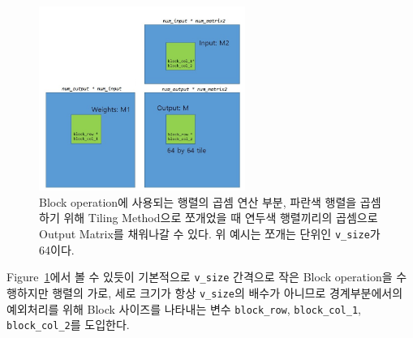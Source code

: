 \documentclass{article}
\begin{document}
\begin{figure}[htb!]
	\centering
	\includegraphics[width=0.6\textwidth]{fig/mm.jpg}
\caption{Block operation에 사용되는 행렬의 곱셈 연산 부분, 파란색 행렬을 곱셈하기 위해 Tiling Method으로 쪼개었을 때 연두색 행렬끼리의 곱셈으로 Output Matrix를 채워나갈 수 있다. 위 예시는 쪼개는 단위인 \texttt{v\_size}가 64이다.}
\label{fig3}
\end{figure}

Figure~\ref{fig3}에서 볼 수 있듯이 기본적으로 \texttt{v\_size} 간격으로 작은 Block operation을 수행하지만 행렬의 가로, 세로 크기가 항상 \texttt{v\_size}의 배수가 아니므로 경계부분에서의 예외처리를 위해 Block 사이즈를 나타내는 변수 \texttt{block\_row},  \texttt{block\_col\_1}, \texttt{block\_col\_2}를 도입한다.
\end{document}
